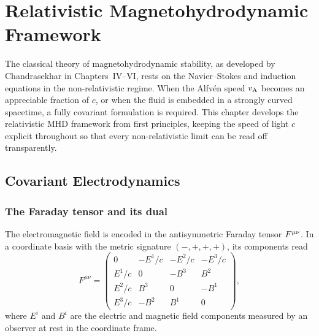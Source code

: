 
\chapter{Relativistic Magnetohydrodynamic Framework}
\label{ch:rel-mhd-framework}

The classical theory of magnetohydrodynamic stability, as developed by
Chandrasekhar in Chapters~IV--VI, rests on the Navier--Stokes and
induction equations in the non-relativistic regime.  When the Alfv\'en
speed $\vA$ becomes an appreciable fraction of $c$, or when the fluid is
embedded in a strongly curved spacetime, a fully covariant formulation is
required.  This chapter develops the relativistic MHD framework from first
principles, keeping the speed of light $c$ explicit throughout so that
every non-relativistic limit can be read off transparently.

\section{Covariant Electrodynamics}
\label{sec:covariant-ed}

\subsection{The Faraday tensor and its dual}

The electromagnetic field is encoded in the antisymmetric Faraday tensor
$\farad$.  In a coordinate basis with the metric signature $(-,+,+,+)$,
its components read
\begin{equation}
  F^{\mu\nu} =
  \begin{pmatrix}
    0      & -E^{1}/c & -E^{2}/c & -E^{3}/c \\
    E^{1}/c &  0       & -B^{3}   &  B^{2}   \\
    E^{2}/c &  B^{3}   &  0       & -B^{1}   \\
    E^{3}/c & -B^{2}   &  B^{1}   &  0
  \end{pmatrix},
  \label{eq:Fmunu-components}
\end{equation}
where $E^{i}$ and $B^{i}$ are the electric and magnetic field components
measured by an observer at rest in the coordinate frame.

